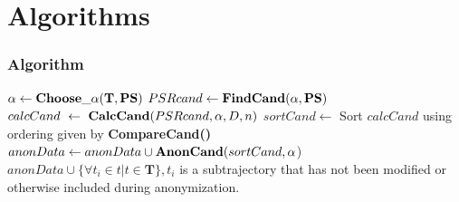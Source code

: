 \section{Algorithms}

\begin{frame}
\frametitle{Algorithm}

\begin{algorithm}[H]
\dontprintsemicolon
\SetVline


% 

{
	$\alpha \leftarrow {\bf Choose\_\alpha(\mathbf{T}, PS)}$ \;
	$PSRcand \leftarrow {\bf FindCand(\alpha, PS)}$ \;
	$calcCand~\leftarrow~{\bf CalcCand}(PSRcand, \alpha, D, n)$ \;
	$sortCand \leftarrow$  Sort $calcCand$ using ordering given by {\bf CompareCand()} \;
	$anonData \leftarrow anonData \cup {\bf AnonCand}(sortCand, \alpha$) \;
}
\(anonData \cup \{\forall t_i  \in t  | t \in \mathbf{T}\}, t_i \) is a subtrajectory that has not been modified or otherwise included during anonymization.

% 


\end{algorithm}
\end{frame}


